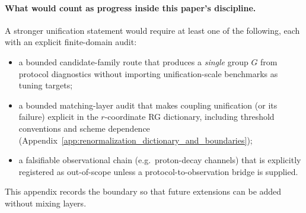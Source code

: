 \paragraph{What would count as progress inside this paper's discipline.}
\AuditTag A stronger unification statement would require at least one of the following, each with an explicit finite-domain audit:
\begin{itemize}
\item a bounded candidate-family route that produces a \emph{single} group $G$ from protocol diagnostics without importing unification-scale benchmarks as tuning targets;
\item a bounded matching-layer audit that makes coupling unification (or its failure) explicit in the $r$-coordinate RG dictionary, including threshold conventions and scheme dependence (Appendix~\ref{app:renormalization_dictionary_and_boundaries});
\item a falsifiable observational chain (e.g.\ proton-decay channels) that is explicitly registered as out-of-scope unless a protocol-to-observation bridge is supplied.
\end{itemize}
This appendix records the boundary so that future extensions can be added without mixing layers.
